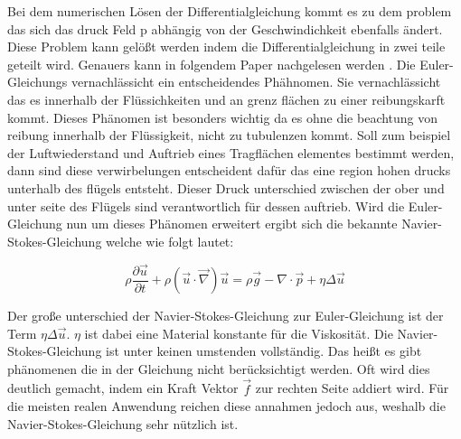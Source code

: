 Bei dem numerischen Lösen der Differentialgleichung kommt es zu dem problem das sich das druck Feld p
abhängig von der Geschwindichkeit ebenfalls ändert.
Diese Problem kann gelößt werden indem die Differentialgleichung in zwei teile geteilt wird.
Genauers kann in folgendem Paper nachgelesen werden \cite{}.
Die Euler-Gleichungs vernachlässicht ein entscheidendes Phähnomen.
Sie vernachlässicht das es innerhalb der Flüssichkeiten und an grenz flächen zu einer reibungskarft kommt.
Dieses Phänomen ist besonders wichtig da es ohne die beachtung von reibung innerhalb der Flüssigkeit,
nicht zu tubulenzen kommt.
Soll zum beispiel der Luftwiederstand und Auftrieb eines Tragflächen elementes bestimmt werden,
dann sind diese verwirbelungen entscheident dafür das eine region hohen drucks unterhalb des flügels entsteht.
Dieser Druck unterschied zwischen der ober und unter seite des Flügels sind verantwortlich für dessen auftrieb.
Wird die Euler-Gleichung nun um dieses Phänomen erweitert ergibt sich die bekannte Navier-Stokes-Gleichung 
welche wie folgt lautet:

$$
\rho \frac{\partial \vec{u}}{\partial t} + \rho (\vec{u} \cdot \vec{\nabla} ) \vec{u} = 
\rho \vec{g} - \nabla \cdot \vec{p} + \eta \Delta \vec{u}
$$

Der große unterschied der Navier-Stokes-Gleichung zur Euler-Gleichung ist der Term $\eta \Delta \vec{u}$.
$\eta$ ist dabei eine Material konstante für die Viskosität.
Die Navier-Stokes-Gleichung ist unter keinen umstenden vollständig.
Das heißt es gibt phänomenen die in der Gleichung nicht berücksichtigt werden.
Oft wird dies deutlich gemacht, indem ein Kraft Vektor $\vec{f}$ zur rechten Seite addiert wird.
Für die meisten realen Anwendung reichen diese annahmen jedoch aus, weshalb die Navier-Stokes-Gleichung sehr nützlich ist.

